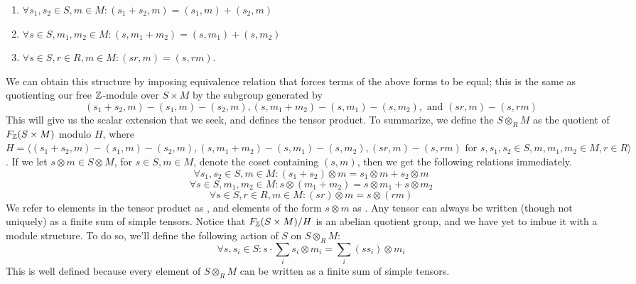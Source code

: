\documentclass{article}
\begin{document}
\begin{enumerate}
    \item $ \forall s_1, s_2 \in S, m \in M: (s_1 + s_2, m) = (s_1, m) + (s_2, m) $
    \item $ \forall s \in S, m_1, m_2 \in M: (s, m_1 + m_2) = (s, m_1) + (s, m_2) $
    \item $ \forall s \in S, r \in R, m \in M: (s r, m) = (s, r m) $.
\end{enumerate}
We can obtain this structure by imposing equivalence relation that forces terms of the above forms to be equal; this is the same as quotienting our free $ \mathbb{Z} $-module over $ S \times M $ by the subgroup generated by
$$ (s_1 + s_2, m) - (s_1, m) - (s_2, m), (s, m_1 + m_2) - (s, m_1) - (s, m_2), \text{ and } (s r, m) - (s, r m) $$
This will give us the scalar extension that we seek, and defines the tensor product.
\nn
To summarize, we define the  $ S \otimes_R M $ as the quotient of $ F_{\mathbb{Z}}(S \times M) $ modulo $ H $, where $ H = \big \langle (s_1 + s_2, m) - (s_1, m) - (s_2, m), (s, m_1 + m_2) - (s, m_1) - (s, m_2), (s r, m) - (s, r m) \text{ for } s, s_1, s_2 \in S, m, m_1, m_2 \in M, r \in R \big \rangle $. If we let $ s \otimes m \in S \otimes M $, for $ s \in S, m \in M $, denote the coset containing $ (s, m) $, then we get the following relations immediately.
$$ \forall s_1, s_2 \in S, m \in M: (s_1 + s_2) \otimes m = s_1 \otimes m + s_2 \otimes m $$
$$ \forall s \in S, m_1, m_2 \in M: s \otimes (m_1 + m_2) = s \otimes m_1 + s \otimes m_2 $$
$$ \forall s \in S, r \in R, m \in M: (s r) \otimes m = s \otimes (r m) $$
We refer to elements in the tensor product as , and elements of the form $ s \otimes m $ as . Any tensor can always be written (though not uniquely) as a finite sum of simple tensors. Notice that $ F_{\mathbb{Z}}(S \times M) / H $ is an abelian quotient group, and we have yet to imbue it with a module structure. To do so, we'll define the following action of $ S $ on $ S \otimes_R M $:
$$ \forall s, s_i \in S: s \cdot \sum_i s_i \otimes m_i = \sum_i (s s_i) \otimes m_i $$
This is well defined because every element of $ S \otimes_R M $ can be written as a finite sum of simple tensors. 
\n
\end{document}
